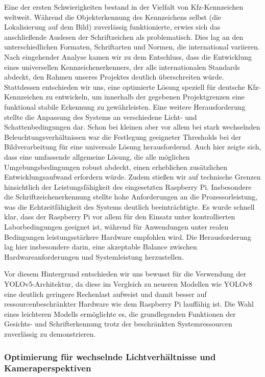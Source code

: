 Eine der ersten Schwierigkeiten bestand in der Vielfalt von Kfz-Kennzeichen weltweit. 
 Während die Objekterkennung des Kennzeichens selbst (die Lokalisierung auf dem Bild) zuverlässig funktionierte, erwies sich das anschließende Auslesen der Schriftzeichen als problematisch. 
 Dies lag an den unterschiedlichen Formaten, Schriftarten und Normen, die international variieren. 
 Nach eingehender Analyse kamen wir zu dem Entschluss, dass die Entwicklung eines universellen Kennzeichenerkenners, der alle internationalen Standards abdeckt, den Rahmen unseres Projektes deutlich überschreiten würde. 
 Stattdessen entschieden wir uns, eine optimierte Lösung speziell für deutsche Kfz-Kennzeichen zu entwickeln, um innerhalb der gegebenen Projektgrenzen eine funktional stabile Erkennung zu gewährleisten.\singlespacing
 Eine weitere Herausforderung stellte die Anpassung des Systems an verschiedene Licht- und Schattenbedingungen dar. 
 Schon bei kleinen aber vor allem bei stark wechselnden Beleuchtungsverhältnissen war die Festlegung geeigneter Thresholds bei der Bildverarbeitung für eine universale Lösung herausfordernd. 
 Auch hier zeigte sich, dass eine umfassende allgemeine Lösung, die alle möglichen Umgebungsbedingungen robust abdeckt, einen erheblichen zusätzlichen Entwicklungsaufwand erfordern würde. \singlespacing
 Zudem stießen wir auf technische Grenzen hinsichtlich der Leistungsfähigkeit des eingesetzten Raspberry Pi.
Insbesondere die Schriftzeichenerkennung stellte hohe Anforderungen an die Prozessorleistung, was die Echtzeitfähigkeit des Systems deutlich beeinträchtigte.
Es wurde schnell klar, dass der Raspberry Pi vor allem für den Einsatz unter kontrollierten Laborbedingungen geeignet ist, während für Anwendungen unter realen Bedingungen leistungsstärkere Hardware empfohlen wird.
Die Herausforderung lag hier insbesondere darin, eine akzeptable Balance zwischen Hardwareanforderungen und Systemleistung herzustellen.

Vor diesem Hintergrund entschieden wir uns bewusst für die Verwendung der YOLOv5-Architektur, da diese im Vergleich zu neueren Modellen wie YOLOv8 eine deutlich geringere Rechenlast aufweist und damit besser auf ressourcenbeschränkter Hardware wie dem Raspberry Pi lauffähig ist.
Die Wahl eines leichteren Modells ermöglichte es, die grundlegenden Funktionen der Gesichts- und Schrifterkennung trotz der beschränkten Systemressourcen zuverlässig zu demonstrieren. 
\subsubsection{Optimierung für wechselnde Lichtverhältnisse und Kameraperspektiven}
